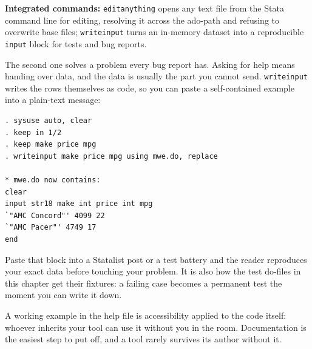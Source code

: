 \begin{kaobox}[frametitle=Package Integration: \texttt{editanything} and \texttt{writeinput}]
\textbf{Integrated commands:} \texttt{editanything} opens any text file from the Stata command line for editing, resolving it across the ado-path and refusing to overwrite base files; \texttt{writeinput} turns an in-memory dataset into a reproducible \texttt{input} block for tests and bug reports.

The second one solves a problem every bug report has. Asking for help means handing over data, and the data is usually the part you cannot send. \texttt{writeinput} writes the rows themselves as code, so you can paste a self-contained example into a plain-text message:
\par
{\footnotesize
\begin{verbatim}
. sysuse auto, clear
. keep in 1/2
. keep make price mpg
. writeinput make price mpg using mwe.do, replace

* mwe.do now contains:
clear
input str18 make int price int mpg
`"AMC Concord"' 4099 22
`"AMC Pacer"' 4749 17
end
\end{verbatim}
}
Paste that block into a Statalist post or a test battery and the reader reproduces your exact data before touching your problem. It is also how the test do-files in this chapter get their fixtures: a failing case becomes a permanent test the moment you can write it down.
\end{kaobox}

A working example in the help file is accessibility applied to the code itself: whoever inherits your tool can use it without you in the room. Documentation is the easiest step to put off, and a tool rarely survives its author without it.

